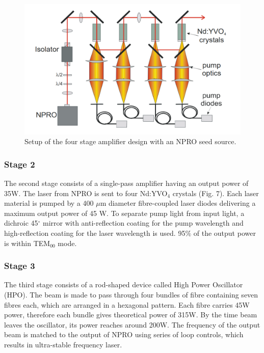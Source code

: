 \documentclass[conference]{IEEEtran}
\begin{document}
\begin{figure}[htbp]
\centerline{\includegraphics[scale=0.35]{amplifier.PNG}}
\caption{Setup of the four stage amplifier design with an NPRO seed source\cite{Frede:07}.}

\end{figure}

\subsubsection{Stage 2}
The second stage consists of a single-pass amplifier having an output power of 35W. The laser from NPRO is sent to four Nd:YVO$_{4}$ crystals (Fig. 7). Each laser material is pumped by a 400 $\mu$m diameter fibre-coupled laser diodes delivering a maximum output power of 45 W. To separate pump light from input light, a dichroic 45$^\circ$ mirror with anti-reflection coating for the pump wavelength and high-reflection coating for the laser wavelength is used\cite{article}. 95$\%$ of the output power is within TEM$_{00}$ mode.   

\subsubsection{Stage 3}
The third stage consists of a rod-shaped device called High Power Oscillator (HPO). The beam is made to pass through four bundles of fibre containing seven fibres each, which are arranged in a hexagonal pattern. Each fibre carries 45W power, therefore each bundle gives theoretical power of 315W. By the time beam leaves the oscillator, its power reaches around 200W. The frequency of the output beam is matched to the output of NPRO using series of loop controls, which results in ultra-stable frequency laser.
\end{document}

